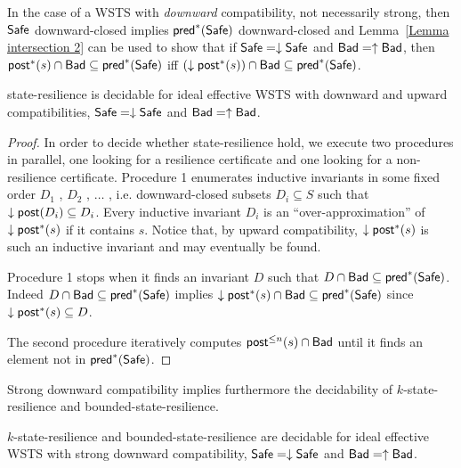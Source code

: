 In the case of a WSTS with \emph{downward} compatibility, not necessarily strong,
then $\textsf{Safe}$ downward-closed implies $\textsf{pred}^*(\textsf{Safe})$ downward-closed and
Lemma~\ref{Lemma intersection 2} can be used to show that
if $\textsf{Safe} = \downarrow \textsf{Safe}$ and $\textsf{Bad} = \uparrow \textsf{Bad}$,
then
$\textsf{post}^*(s) \cap \textsf{Bad} \subseteq \textsf{pred}^*(\textsf{Safe})$  iff $ (\downarrow  \textsf{post}^*(s)) \cap \textsf{Bad} \subseteq \textsf{pred}^*(\textsf{Safe})$.


\begin{theorem}\label{downward srp}
{\sc state-resilience} is decidable for ideal effective WSTS with downward and upward compatibilities,
$\textsf{Safe} = \downarrow \textsf{Safe}$ and $\textsf{Bad} = \uparrow \textsf{Bad}$.
\end{theorem}

\begin{proof}
In order to decide whether state-resilience hold, we execute two procedures in parallel,
one looking for a resilience certificate and one looking for a non-resilience certificate.
Procedure 1 enumerates inductive invariants in some fixed order $D_1$ , $D_2$ , $\ldots$ , i.e. downward-closed subsets $D_i \subseteq S$ such that $\downarrow \textsf{post}(D_i ) \subseteq D_i$. 
Every inductive invariant $D_i$ is an “over-approximation” of $\downarrow \textsf{post}^*(s)$ if it contains $s$.
Notice that, by 
upward compatibility, $\downarrow \textsf{post}^*(s)$ is such an inductive invariant and may eventually be found.

Procedure 1 stops when it finds an invariant $D$ such that
$D  \cap \textsf{Bad} \subseteq \textsf{pred}^*(\textsf{Safe})$. 
Indeed
$D  \cap \textsf{Bad} \subseteq  \textsf{pred}^*(\textsf{Safe})$ implies
$\downarrow \textsf{post}^*(s) \cap \textsf{Bad} \subseteq  \textsf{pred}^*(\textsf{Safe})$
since $ \downarrow \textsf{post}^*(s)  \subseteq D$.

The second procedure iteratively computes
$\textsf{post}^{\leq n}(s) \cap \textsf{Bad}$
until it finds an element
not in $\textsf{pred}^*(\textsf{Safe})$.
\end{proof}



Strong downward compatibility implies furthermore the decidability
of {\sc $k$-state-resilience} and {\sc bounded-state-resilience}.

\begin{proposition}\label{downward brp}
{\sc $k$-state-resilience} and {\sc bounded-state-resilience} are decidable for ideal effective WSTS with strong downward compatibility,
$\textsf{Safe} = \downarrow \textsf{Safe}$ and $\textsf{Bad} = \uparrow \textsf{Bad}$.
\end{proposition}





